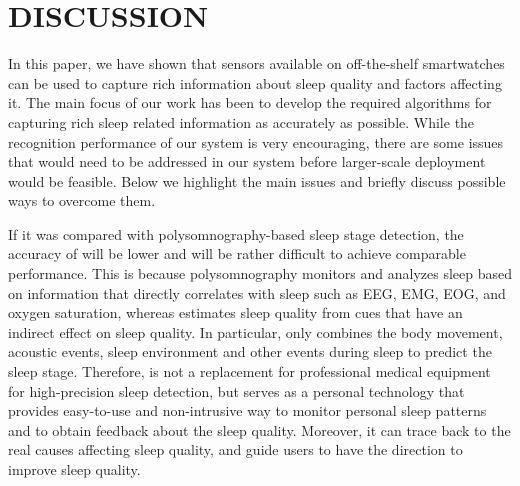\section{DISCUSSION}\label{sec:discussion}

In this paper, we have shown that sensors available on off-the-shelf smartwatches can be used to capture rich information about sleep
quality and factors affecting it. The main focus of our work has been to develop the required algorithms for capturing rich sleep related
information as accurately as possible. While the recognition performance of our system is very encouraging, there are some issues that
would need to be addressed in our system before larger-scale deployment would be feasible. Below we highlight the main issues and briefly
discuss possible ways to overcome them.


  If it was compared with polysomnography-based sleep stage detection, the accuracy of {\systemname} will
      be lower and will be rather difficult to achieve comparable performance. This is because polysomnography monitors and analyzes sleep
      based on information that directly correlates with sleep such as EEG, EMG, EOG, and oxygen saturation, whereas {\systemname}
      estimates sleep quality from cues that have an indirect effect on sleep quality. In particular, \systemname only combines the body
      movement, acoustic events, sleep environment and other events during sleep to predict the sleep stage. Therefore, {\systemname} is
      not a replacement for professional medical equipment for high-precision sleep detection, but serves as a personal technology that
      provides easy-to-use and non-intrusive way to monitor personal sleep patterns and to obtain feedback about the sleep quality.
      Moreover, it can trace back to the real causes affecting sleep quality, and guide users to have the direction to improve sleep
      quality. 

